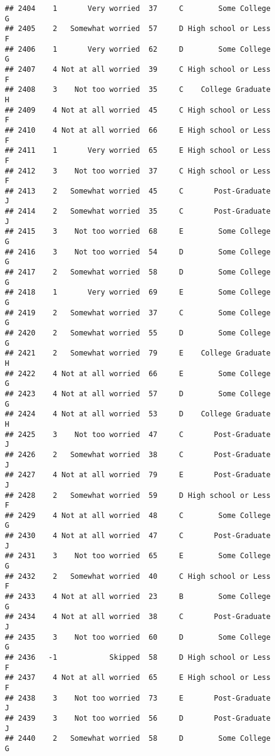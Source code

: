 \documentclass[
]{article}
\begin{document}
\begin{verbatim}
## 2404    1       Very worried  37     C        Some College         G
## 2405    2   Somewhat worried  57     D High school or Less         F
## 2406    1       Very worried  62     D        Some College         G
## 2407    4 Not at all worried  39     C High school or Less         F
## 2408    3    Not too worried  35     C    College Graduate         H
## 2409    4 Not at all worried  45     C High school or Less         F
## 2410    4 Not at all worried  66     E High school or Less         F
## 2411    1       Very worried  65     E High school or Less         F
## 2412    3    Not too worried  37     C High school or Less         F
## 2413    2   Somewhat worried  45     C       Post-Graduate         J
## 2414    2   Somewhat worried  35     C       Post-Graduate         J
## 2415    3    Not too worried  68     E        Some College         G
## 2416    3    Not too worried  54     D        Some College         G
## 2417    2   Somewhat worried  58     D        Some College         G
## 2418    1       Very worried  69     E        Some College         G
## 2419    2   Somewhat worried  37     C        Some College         G
## 2420    2   Somewhat worried  55     D        Some College         G
## 2421    2   Somewhat worried  79     E    College Graduate         H
## 2422    4 Not at all worried  66     E        Some College         G
## 2423    4 Not at all worried  57     D        Some College         G
## 2424    4 Not at all worried  53     D    College Graduate         H
## 2425    3    Not too worried  47     C       Post-Graduate         J
## 2426    2   Somewhat worried  38     C       Post-Graduate         J
## 2427    4 Not at all worried  79     E       Post-Graduate         J
## 2428    2   Somewhat worried  59     D High school or Less         F
## 2429    4 Not at all worried  48     C        Some College         G
## 2430    4 Not at all worried  47     C       Post-Graduate         J
## 2431    3    Not too worried  65     E        Some College         G
## 2432    2   Somewhat worried  40     C High school or Less         F
## 2433    4 Not at all worried  23     B        Some College         G
## 2434    4 Not at all worried  38     C       Post-Graduate         J
## 2435    3    Not too worried  60     D        Some College         G
## 2436   -1            Skipped  58     D High school or Less         F
## 2437    4 Not at all worried  65     E High school or Less         F
## 2438    3    Not too worried  73     E       Post-Graduate         J
## 2439    3    Not too worried  56     D       Post-Graduate         J
## 2440    2   Somewhat worried  58     D        Some College         G

\end{verbatim}
\end{document}
